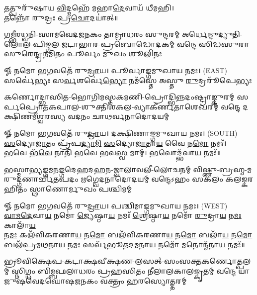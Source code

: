 {\small \closesection}

\begin{center}
𑌤𑌤𑍍𑌪𑍁𑌰𑍁᳴𑌷𑌾𑌯 \ul{𑌵𑌿}\-𑌦𑍍𑌮𑌹𑍇᳴ 𑌮𑌹𑌾\-\ul{𑌦𑍇}\-𑌵𑌾𑌯᳴ 𑌧𑍀𑌮𑌹𑌿।\\
𑌤𑌨𑍍𑌨𑍋᳴ 𑌰𑍁𑌦𑍍𑌰𑌃 𑌪𑍍𑌰\-\ul{𑌚𑍋}\-𑌦𑌯𑌾॑𑌤𑍍॥

{𑌗𑌮𑍍𑌭𑍀𑌰𑌧𑍍𑌵𑌨𑌿-𑌸𑌾𑌮𑌵𑍇𑌦𑌜𑌨𑌕𑌂 𑌤𑌾𑌮𑍍𑌰𑌾𑌧𑌰𑌂 𑌸𑍁𑌨𑍍𑌦𑌰𑌮𑍍}
{𑌅𑌰𑍍𑌧𑍇𑌨𑍍𑌦𑍁𑌦𑍍𑌯𑍁𑌤𑌿-𑌲𑍋𑌲-𑌪𑌿𑌙𑍍𑌗𑌲-𑌜𑌟𑌾𑌭𑌾𑌰-𑌪𑍍𑌰𑌬𑍋𑌦𑍍𑌧𑍋𑌦𑌕𑌮𑍍}
{𑌵𑌨𑍍𑌦𑍇 𑌸𑌿𑌦𑍍𑌧𑌸𑍁𑌰𑌾𑌸𑍁𑌰𑍇𑌨𑍍𑌦𑍍𑌰𑌨𑌮𑌿𑌤𑌂 𑌪𑍂𑌰𑍍𑌵𑌂 𑌮𑍁𑌖𑌂 𑌶𑍂𑌲𑌿𑌨𑌃}

𑍐 𑌨𑌮𑍋 𑌭𑌗𑌵𑌤𑍇᳴ 𑌰𑍁\-\ul{𑌦𑍍𑌰𑌾}\-𑌯। 𑌪𑍂𑌰𑍍𑌵𑌾𑌙𑍍𑌗𑌮𑍁𑌖𑌾𑌯 𑌨𑌮𑌃। {\scriptsize (EAST)}\\[1em]

{𑌸𑌰𑍍𑌵𑍇॑𑌭𑍍𑌯𑌃 𑌸\-\ul{𑌰𑍍𑌵}\-𑌶𑌰𑍍𑌵𑍇॑\-\ul{𑌭𑍍𑌯𑍋} 𑌨𑌮᳴𑌸𑍍𑌤𑍇 𑌅𑌸𑍍𑌤𑍁 \ul{𑌰𑍁}\-𑌦𑍍𑌰𑌰𑍂᳴𑌪𑍇𑌭𑍍𑌯𑌃}

{𑌕𑌰𑍍𑌣𑍋𑌦𑍍𑌭𑌾𑌸𑌿𑌤-𑌭𑍋𑌗𑌿𑌮𑌸𑍍𑌤𑌕𑌮𑌣𑌿-𑌪𑍍𑌰𑍋𑌦𑍍𑌭𑌿𑌨𑍍𑌨𑌦𑌂𑌷𑍍𑌟𑍍𑌰𑌾𑌙𑍍𑌕𑍁𑌰𑌮𑍍}
{𑌸𑌰𑍍𑌪𑌪𑍍𑌰𑍋𑌤𑌕𑌪𑌾𑌲-𑌶𑍁𑌕𑍍𑌤𑌿𑌶𑌕𑌲-𑌵𑍍𑌯𑌾𑌕𑍀𑌰𑍍𑌣𑌤𑌾𑌶𑍇𑌖𑌰𑌮𑍍}
{𑌵𑌨𑍍𑌦𑍇 𑌦𑌕𑍍𑌷𑌿𑌣𑌮𑍀𑌶𑍍𑌵𑌰𑌸𑍍𑌯 𑌵𑌦𑌨𑌂 𑌚𑌾𑌥𑌰𑍍𑌵𑌨𑌾𑌦𑍋𑌦𑌯𑌮𑍍}

𑍐 𑌨𑌮𑍋 𑌭𑌗𑌵𑌤𑍇᳴ 𑌰𑍁\-\ul{𑌦𑍍𑌰𑌾}\-𑌯। 𑌦𑌕𑍍𑌷𑌿𑌣𑌾𑌙𑍍𑌗𑌮𑍁𑌖𑌾𑌯 𑌨𑌮𑌃। {\scriptsize (SOUTH)}\\[1em]

\-\ul{𑌸}\-𑌦𑍍𑌯𑍋\-\ul{𑌜𑌾}\-𑌤𑌂 𑌪𑍍𑌰᳴𑌪\-\ul{𑌦𑍍𑌯𑌾}\-\-\ul{𑌮𑌿} \ul{𑌸}\-𑌦𑍍𑌯𑍋\-\ul{𑌜𑌾}\-𑌤𑌾\-\ul{𑌯} 𑌵𑍈 𑌨\-\ul{𑌮𑍋} 𑌨𑌮𑌃᳴।\\
\-\ul{𑌭}\-𑌵𑍇 𑌭᳴\-\ul{𑌵𑍇} 𑌨𑌾𑌤𑌿᳴ 𑌭𑌵𑍇 𑌭𑌵\-\ul{𑌸𑍍𑌵} 𑌮𑌾𑌮𑍍। \ul{𑌭}\-𑌵𑍋𑌦𑍍𑌭᳴𑌵𑌾\-\ul{𑌯} 𑌨𑌮𑌃᳴॥ 

{𑌭𑌸𑍍𑌮𑌾𑌭𑍍𑌯𑌙𑍍𑌗𑌮𑌨𑌙𑍍𑌗𑌦𑍇𑌹𑌦𑌹𑌨-𑌜𑍍𑌵𑌾𑌲𑌾𑌵𑌲𑍀-𑌲𑍋𑌚𑌨𑌮𑍍}
{𑌵𑌿𑌷𑍍𑌣𑍁-𑌬𑍍𑌰𑌹𑍍𑌮-𑌮𑌰𑍁𑌦𑍍𑌗𑌣𑌾𑌰𑍍𑌚𑌿𑌤𑌪𑌦𑌂 𑌋𑌗𑍍𑌵𑍇𑌦𑌨𑌾𑌦𑍋𑌦𑌯𑌮𑍍}
{𑌵𑌨𑍍𑌦𑍇𑌽𑌹𑌂 𑌸𑌕𑌲𑌂 𑌕𑌲𑌙𑍍𑌕𑌰𑌹𑌿𑌤𑌂 𑌸𑍍𑌥𑌾𑌣𑍋𑌰𑍍𑌮𑍁𑌖𑌂 𑌪𑌶𑍍𑌚𑌿𑌮𑌮𑍍}

𑍐 𑌨𑌮𑍋 𑌭𑌗𑌵𑌤𑍇᳴ 𑌰𑍁\-\ul{𑌦𑍍𑌰𑌾}\-𑌯। 𑌪𑌶𑍍𑌚𑌿𑌮𑌾𑌙𑍍𑌗𑌮𑍁𑌖𑌾𑌯 𑌨𑌮𑌃। {\scriptsize (WEST)}\\[1em]

\-\ul{𑌵𑌾}\-\-\ul{𑌮}\-\-\ul{𑌦𑍇}\-𑌵𑌾\-\ul{𑌯} 𑌨𑌮𑍋॑ \ul{𑌜𑍍𑌯𑍇}\-𑌷𑍍𑌠𑌾\-\ul{𑌯} 𑌨𑌮𑌃᳴ \ul{𑌶𑍍𑌰𑍇}\-𑌷𑍍𑌠𑌾\-\ul{𑌯} 𑌨𑌮𑍋᳴ \ul{𑌰𑍁}\-𑌦𑍍𑌰𑌾\-\ul{𑌯} 𑌨\-\ul{𑌮𑌃} 𑌕𑌾𑌲𑌾᳴\-\ul{𑌯}\-\\ 𑌨\-\ul{𑌮𑌃} 𑌕𑌲᳴𑌵𑌿𑌕𑌰𑌣𑌾\-\ul{𑌯} 𑌨\-\ul{𑌮𑍋} 𑌬𑌲᳴𑌵𑌿𑌕𑌰𑌣𑌾\-\ul{𑌯} 𑌨\-\ul{𑌮𑍋} 𑌬𑌲𑌾᳴\-\ul{𑌯} 𑌨\-\ul{𑌮𑍋} 𑌬𑌲᳴𑌪𑍍𑌰𑌮𑌥𑌨𑌾\-\ul{𑌯} 𑌨\-\ul{𑌮𑌃} 𑌸𑌰𑍍𑌵᳴𑌭𑍂𑌤𑌦𑌮𑌨𑌾\-\ul{𑌯} 𑌨𑌮𑍋᳴ \ul{𑌮}\-𑌨𑍋𑌨𑍍𑌮᳴𑌨𑌾\-\ul{𑌯} 𑌨𑌮𑌃᳴॥

{𑌭𑍍𑌰𑍂𑌵𑌿𑌕𑍍𑌷𑍇𑌪-𑌕𑌟𑌾𑌕𑍍𑌷𑌵𑍀𑌕𑍍𑌷𑌣-𑌲𑌸𑌤𑍍-𑌸𑌂𑌸𑌕𑍍𑌤𑌕𑌰𑍍𑌣𑍋𑌤𑍍𑌪𑌲𑌮𑍍}
{𑌸𑍍𑌨𑌿𑌗𑍍𑌧𑌂 𑌬𑌿𑌮𑍍𑌬𑌫𑌲𑌾𑌧𑌰𑌂 𑌪𑍍𑌰𑌹𑌸𑌿𑌤𑌂 𑌨𑍀𑌲𑌾𑌲𑌕𑌾𑌲𑌙𑍍𑌕𑍃𑌤𑌮𑍍}
{𑌵𑌨𑍍𑌦𑍇 𑌯𑌾𑌜𑍁𑌷𑌵𑍇𑌦𑌘𑍋𑌷𑌜𑌨𑌕𑌂 𑌵𑌕𑍍𑌤𑍍𑌰𑌂 𑌹𑌰𑌸𑍍𑌯𑍋𑌤𑍍𑌤𑌰𑌮𑍍}


\end{center}
